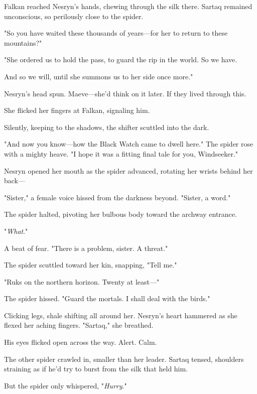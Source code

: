 Falkan reached Nesryn's hands, chewing through the silk there.
Sartaq remained unconscious, so perilously close to the spider.

"So you have waited these thousands of years---for her to return to these mountains?"

"She ordered us to hold the pass, to guard the rip in the world.
So we have.

And so we will, until she summons us to her side once more."

Nesryn's head spun.
Maeve---she'd think on it later.
If they lived through this.

She flicked her fingers at Falkan, signaling him.

Silently, keeping to the shadows, the shifter scuttled into the dark.

"And now you know---how the Black Watch came to dwell here."
The spider rose with a mighty heave.
"I hope it was a fitting final tale for you, Windseeker."

Nesryn opened her mouth as the spider advanced, rotating her wrists behind her back---

"Sister," a female voice hissed from the darkness beyond.
"Sister, a word."

The spider halted, pivoting her bulbous body toward the archway entrance.

"\emph{What}."

A beat of fear.
"There is a problem, sister.
A threat."

The spider scuttled toward her kin, snapping, "Tell me."

"Ruks on the northern horizon.
Twenty at least---"

The spider hissed.
"Guard the mortals.
I shall deal with the birds."

Clicking legs, shale shifting all around her.
Nesryn's heart hammered as she flexed her aching fingers.
"Sartaq," she breathed.

His eyes flicked open across the way.
Alert.
Calm.

The other spider crawled in, smaller than her leader.
Sartaq tensed, shoulders straining as if he'd try to burst from the silk that held him.

But the spider only whispered, "\emph{Hurry}."


